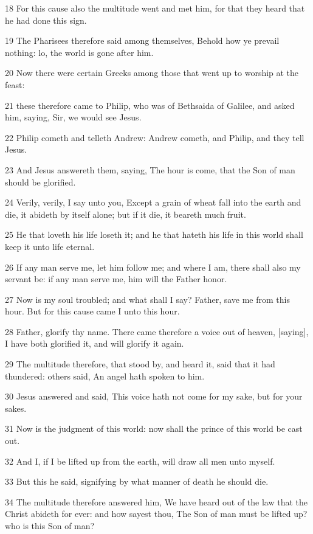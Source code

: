 \par 18 For this cause also the multitude went and met him, for that they heard that he had done this sign.
\par 19 The Pharisees therefore said among themselves, Behold how ye prevail nothing: lo, the world is gone after him.
\par 20 Now there were certain Greeks among those that went up to worship at the feast:
\par 21 these therefore came to Philip, who was of Bethsaida of Galilee, and asked him, saying, Sir, we would see Jesus.
\par 22 Philip cometh and telleth Andrew: Andrew cometh, and Philip, and they tell Jesus.
\par 23 And Jesus answereth them, saying, The hour is come, that the Son of man should be glorified.
\par 24 Verily, verily, I say unto you, Except a grain of wheat fall into the earth and die, it abideth by itself alone; but if it die, it beareth much fruit.
\par 25 He that loveth his life loseth it; and he that hateth his life in this world shall keep it unto life eternal.
\par 26 If any man serve me, let him follow me; and where I am, there shall also my servant be: if any man serve me, him will the Father honor.
\par 27 Now is my soul troubled; and what shall I say? Father, save me from this hour. But for this cause came I unto this hour.
\par 28 Father, glorify thy name. There came therefore a voice out of heaven, [saying], I have both glorified it, and will glorify it again.
\par 29 The multitude therefore, that stood by, and heard it, said that it had thundered: others said, An angel hath spoken to him.
\par 30 Jesus answered and said, This voice hath not come for my sake, but for your sakes.
\par 31 Now is the judgment of this world: now shall the prince of this world be cast out.
\par 32 And I, if I be lifted up from the earth, will draw all men unto myself.
\par 33 But this he said, signifying by what manner of death he should die.
\par 34 The multitude therefore answered him, We have heard out of the law that the Christ abideth for ever: and how sayest thou, The Son of man must be lifted up? who is this Son of man?
